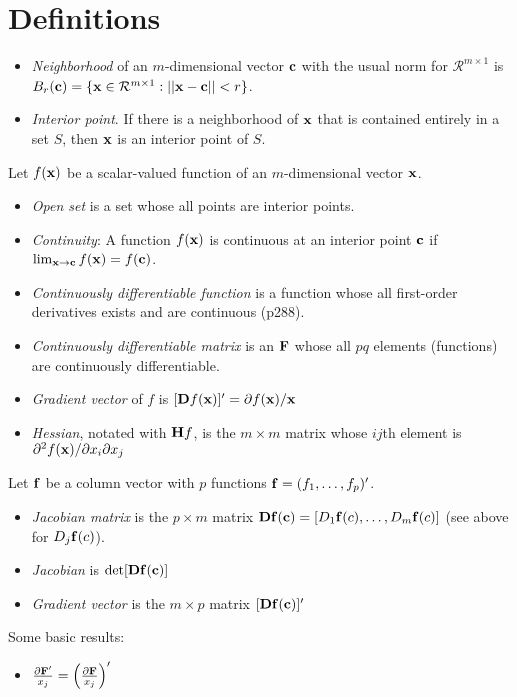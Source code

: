 \documentclass[a4paper, oneside]{book}
\begin{document}
\section{Definitions}
\begin{itemize}
\item \textit{Neighborhood} of an $m$-dimensional vector $\mathbf{c}$ with the usual norm for $\mathcal{R}^{m\times 1}$ is $B_r(\mathbf{c})=\{\mathbf{x}\in \mathcal{R}^{m\times 1} : ||\mathbf{x-c}||<r\}$.
\item \textit{Interior point}. If there is a neighborhood of $\mathbf{x}$ that is contained entirely in a set $S$, then $\mathbf{x}$ is an interior point of $S$.
\end{itemize}
%
Let $f(\mathbf{x})$ be a scalar-valued function of an $m$-dimensional vector $\mathbf{x}$.
\begin{itemize}
\item \textit{Open set} is a set whose all points are interior points.
\item \textit{Continuity}: A function $f(\mathbf{x})$ is continuous at an interior point $\mathbf{c}$ if $\lim_{\mathbf{x}\to\mathbf{c}} f(\mathbf{x})=f(\mathbf{c})$.
\item \textit{Continuously differentiable function} is a function whose all first-order derivatives exists and are continuous (p288).
\item \textit{Continuously differentiable matrix} is an $\mathbf{F}$ whose all $pq$ elements (\ie functions) are continuously differentiable.
\item \textit{Gradient vector} of $f$ is $[\mathbf{D}f(\mathbf{x})]' = \partial f(\mathbf{x})/\mathbf{x}$
\item \textit{Hessian}, notated with $\mathbf{H}f$, is the $m\times m$ matrix whose $ij$th element is $\partial^2 f(\mathbf{x})/\partial x_i \partial x_j$
\end{itemize}
%
Let $\mathbf{f}$ be a column vector with $p$ functions $\mathbf{f}=(f_1, \hdots, f_p)'$.
\begin{itemize}
\item \textit{Jacobian matrix} is the $p\times m$ matrix $\mathbf{Df(c)}=[D_1\mathbf{f}(c), \hdots, D_m\mathbf{f}(c)]$  (see above for $D_j\mathbf{f}(c)$).
\item \textit{Jacobian} is $\det[\mathbf{Df(c)}]$
\item \textit{Gradient vector} is the $m\times p$ matrix $[\mathbf{Df(c)}]'$
\end{itemize}
Some basic results:
\begin{itemize}
\item $\frac{\partial \mathbf{F}'}{x_j}=\left(\frac{\partial \mathbf{F}}{x_j}\right)'$
\end{itemize}
\end{document}
